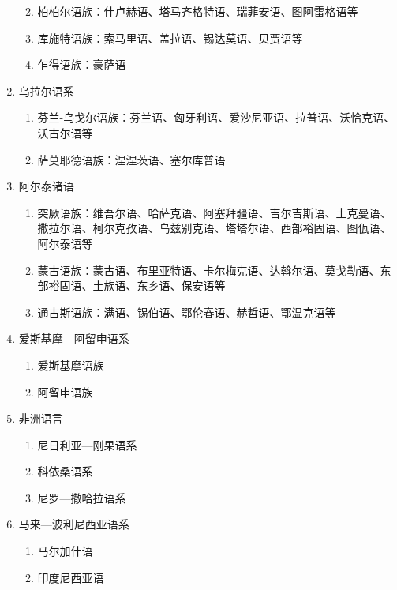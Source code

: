 \documentclass[12pt]{book}
\begin{document}
\begin{enumerate}[1.]
\begin{enumerate}[(1)]
\begin{enumerate}[a.]
              \end{enumerate}
              \item 柏柏尔语族：什卢赫语、塔马齐格特语、瑞菲安语、图阿雷格语等
              \item 库施特语族：索马里语、盖拉语、锡达莫语、贝贾语等
              \item 乍得语族：豪萨语
          \end{enumerate}
    \item 乌拉尔语系
          \begin{enumerate}[(1)]
              \item 芬兰-乌戈尔语族：芬兰语、匈牙利语、爱沙尼亚语、拉普语、沃恰克语、沃古尔语等
              \item 萨莫耶德语族：涅涅茨语、塞尔库普语
          \end{enumerate}
    \item 阿尔泰诸语
          \begin{enumerate}[(1)]
              \item 突厥语族：维吾尔语、哈萨克语、阿塞拜疆语、吉尔吉斯语、土克曼语、撒拉尔语、柯尔克孜语、乌兹别克语、塔塔尔语、西部裕固语、图佤语、阿尔泰语等
              \item 蒙古语族：蒙古语、布里亚特语、卡尔梅克语、达斡尔语、莫戈勒语、东部裕固语、土族语、东乡语、保安语等
              \item 通古斯语族：满语、锡伯语、鄂伦春语、赫哲语、鄂温克语等
          \end{enumerate}
    \item 爱斯基摩—阿留申语系
          \begin{enumerate}[(1)]
              \item 爱斯基摩语族
              \item 阿留申语族
          \end{enumerate}
    \item 非洲语言
          \begin{enumerate}[(1)]
              \item 尼日利亚—刚果语系
              \item 科依桑语系
              \item 尼罗—撒哈拉语系
          \end{enumerate}
    \item 马来—波利尼西亚语系
          \begin{enumerate}[(1)]
              \item 马尔加什语
              \item 印度尼西亚语

\end{enumerate}
\end{enumerate}
\end{document}
